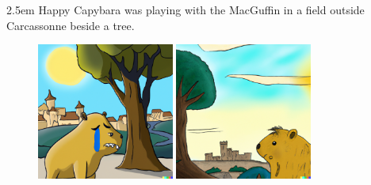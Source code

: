 \documentclass{article}
\newcommand{\imagewidthfactor}{0.4}
\newcommand{\addmarginA}{2.5em}
\newcommand{\addmarginB}{2.5em}
\begin{document}
\begin{addmargin}[\addmarginA]{\addmarginB}
Happy Capybara was playing with the MacGuffin in a field outside Carcassonne
beside a tree.
\end{addmargin}

\newpage %

\begin{figure}[h!]
\centering
\includegraphics[width=\imagewidthfactor\textwidth]{media/2a.png}
\quad
\includegraphics[width=\imagewidthfactor\textwidth]{media/2b.png}\\

\end{figure}
\end{document}
